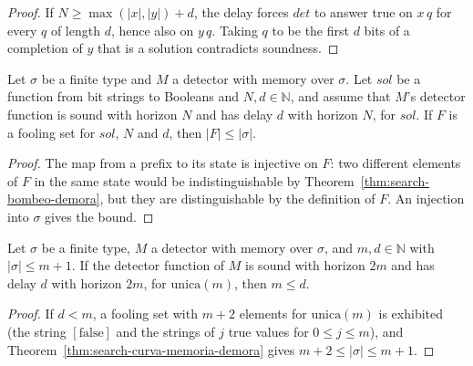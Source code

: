 \begin{proof}
  \leanok
  If $N \ge \max(|x|, |y|) + d$, the delay forces $\mathit{det}$ to answer true on $x\,q$ for every
  $q$ of length $d$, hence also on $y\,q$. Taking $q$ to be the first $d$ bits of a completion of
  $y$ that is a solution contradicts soundness.
\end{proof}

\begin{theorem}
  \label{thm:search-curva-memoria-demora}
  \leanok
  Let $\sigma$ be a finite type and $M$ a detector with memory over $\sigma$. Let $\mathit{sol}$ be a
  function from bit strings to Booleans and $N, d \in \mathbb{N}$, and assume that $M$'s detector
  function is sound with horizon $N$ and has delay $d$ with horizon $N$, for $\mathit{sol}$. If $F$
  is a fooling set for $\mathit{sol}$, $N$ and $d$, then $|F| \le |\sigma|$.
  \own{}
\end{theorem}

\begin{proof}
  \leanok
  The map from a prefix to its state is injective on $F$: two different elements of $F$ in the
  same state would be indistinguishable by Theorem~\ref{thm:search-bombeo-demora}, but they are
  distinguishable by the definition of $F$. An injection into $\sigma$ gives the bound.
\end{proof}

\begin{theorem}
  \label{thm:search-cota-inferior-fina}
  \leanok
  Let $\sigma$ be a finite type, $M$ a detector with memory over $\sigma$, and $m, d \in
  \mathbb{N}$ with $|\sigma| \le m + 1$. If the detector function of $M$ is sound with horizon $2m$
  and has delay $d$ with horizon $2m$, for $\mathrm{unica}(m)$, then $m \le d$.
  \own{}
\end{theorem}

\begin{proof}
  \leanok
  If $d < m$, a fooling set with $m + 2$ elements for $\mathrm{unica}(m)$ is exhibited (the string
  $[\mathrm{false}]$ and the strings of $j$ true values for $0 \le j \le m$), and
  Theorem~\ref{thm:search-curva-memoria-demora} gives $m + 2 \le |\sigma| \le m + 1$.
\end{proof}

